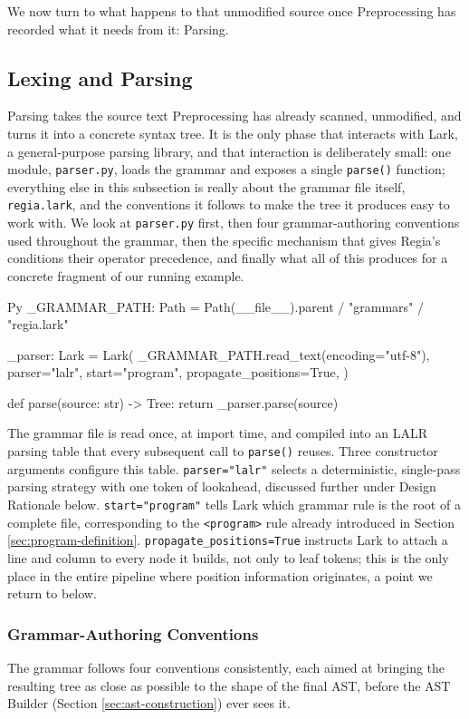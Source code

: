 We now turn to what happens to that unmodified source once Preprocessing has recorded what it needs from it: Parsing.

\subsection{Lexing and Parsing}
\label{sec:lexing-and-parsing}
Parsing takes the source text Preprocessing has already scanned, unmodified, and turns it into a concrete syntax tree. It is the only phase that interacts with Lark, a general-purpose parsing library, and that interaction is deliberately small: one module, \lstinline|parser.py|, loads the grammar and exposes a single \lstinline|parse()| function; everything else in this subsection is really about the grammar file itself, \lstinline|regia.lark|, and the conventions it follows to make the tree it produces easy to work with. We look at \lstinline|parser.py| first, then four grammar-authoring conventions used throughout the grammar, then the specific mechanism that gives Regia's conditions their operator precedence, and finally what all of this produces for a concrete fragment of our running example.

\begin{codeblock}[]{Py}
_GRAMMAR_PATH: Path = Path(__file__).parent / "grammars" / "regia.lark"

_parser: Lark = Lark(
    _GRAMMAR_PATH.read_text(encoding="utf-8"),
    parser="lalr",
    start="program",
    propagate_positions=True,
)

def parse(source: str) -> Tree:
    return _parser.parse(source)
\end{codeblock}
The grammar file is read once, at import time, and compiled into an LALR parsing table that every subsequent call to \lstinline|parse()| reuses. Three constructor arguments configure this table. \lstinline|parser="lalr"| selects a deterministic, single-pass parsing strategy with one token of lookahead, discussed further under Design Rationale below. \lstinline|start="program"| tells Lark which grammar rule is the root of a complete file, corresponding to the \lstinline|<program>| rule already introduced in Section \ref{sec:program-definition}. \lstinline|propagate_positions=True| instructs Lark to attach a line and column to every node it builds, not only to leaf tokens; this is the only place in the entire pipeline where position information originates, a point we return to below.

\subsubsection{Grammar-Authoring Conventions}
The grammar follows four conventions consistently, each aimed at bringing the resulting tree as close as possible to the shape of the final AST, before the AST Builder (Section \ref{sec:ast-construction}) ever sees it.

